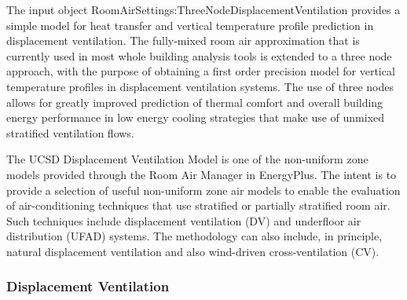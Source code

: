 The input object RoomAirSettings:ThreeNodeDisplacementVentilation provides a simple model for heat transfer and vertical temperature profile prediction in displacement ventilation. The fully-mixed room air approximation that is currently used in most whole building analysis tools is extended to a three node approach, with the purpose of obtaining a first order precision model for vertical temperature profiles in displacement ventilation systems. The use of three nodes allows for greatly improved prediction of thermal comfort and overall building energy performance in low energy cooling strategies that make use of unmixed stratified ventilation flows.

The UCSD Displacement Ventilation Model is one of the non-uniform zone models provided through the Room Air Manager in EnergyPlus. The intent is to provide a selection of useful non-uniform zone air models to enable the evaluation of air-conditioning techniques that use stratified or partially stratified room air. Such techniques include displacement ventilation (DV) and underfloor air distribution (UFAD) systems. The methodology can also include, in principle, natural displacement ventilation and also wind-driven cross-ventilation (CV).

\subsubsection{Displacement Ventilation}\label{displacement-ventilation}

